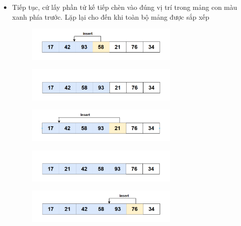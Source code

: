 \begin{itemize}
\item Tiếp tục, cứ lấy phần tử kế tiếp chèn vào đúng vị trí trong mảng con màu xanh phía trước. Lặp lại cho đến khi toàn bộ mảng được sắp xếp
    \begin{figure}[H]
        \centering
        \includegraphics[width=0.7\textwidth]{img/inssertion sort/7.png}

    \end{figure}

    \begin{figure}[H]
        \centering
        \includegraphics[width=0.7\textwidth]{img/inssertion sort/8.png}

    \end{figure}

    \begin{figure}[H]
        \centering
        \includegraphics[width=0.7\textwidth]{img/inssertion sort/9.png}

    \end{figure}
    
    \begin{figure}[H]
        \centering        
        \includegraphics[width=0.7\textwidth]{img/inssertion sort/10.png}

    \end{figure}

    \begin{figure}[H]
        \centering
        \includegraphics[width=0.7\textwidth]{img/inssertion sort/11.png}


\end{figure}
\end{itemize}
